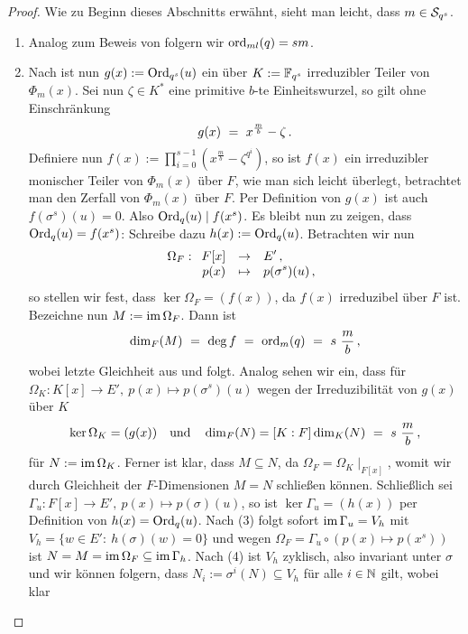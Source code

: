 \begin{proof}
  Wie zu Beginn dieses Abschnitts erwähnt, sieht man leicht, dass
  $m \in \S_{q^s}$.
  \begin{enumerate}
    \item Analog zum Beweis von  
      folgern wir $\ord_{ml}(q) = sm$.
    \item Nach  ist nun
      $g(x) := \Ord_{q^s}(u)$ ein über $K := \F_{q^s}$ irreduzibler Teiler von
      $\Phi_m(x)$. Sei nun $\zeta\in K^\ast$ eine primitive $b$-te Einheitswurzel,
      so gilt ohne Einschränkung
      \[ g(x) \speq= x^{\frac m b} -\zeta\,.\]
      Definiere nun $f(x) := \prod_{i=0}^{s-1} (x^{\frac m b} - \zeta^{q^i})$, 
      so ist $f(x)$ ein irreduzibler monischer Teiler von $\Phi_m(x)$ über $F$,
      wie man sich leicht überlegt, betrachtet man den Zerfall von
      $\Phi_m(x)$ über $F$. Per Definition von $g(x)$ ist auch
      $f(\sigma^s)(u) = 0$. Also $\Ord_q(u) \mid f(x^s)$.
      Es bleibt nun zu zeigen, dass $\Ord_q(u) = f(x^s)$:
      Schreibe dazu $h(x) := \Ord_q(u)$. 
      Betrachten wir nun 
      \[ \Omega_F:\funcdef{ F[x] &\to& E'\,, \\
        p(x) &\mapsto& p(\sigma^s)(u)\,,}\]
      so stellen wir fest, dass $\ker\Omega_F = (f(x))$, da $f(x)$ irreduzibel
      über $F$ ist.
      Bezeichne nun $M := \im\Omega_F$. Dann ist 
      \[ \dim_F(M) \speq= \deg f \speq= \ord_m(q) \speq= s\ \frac m b\,,\]
      wobei letzte Gleichheit aus  und 
      folgt. Analog sehen wir ein, dass für
      $\Omega_K: K[x] \to E',\ p(x) \mapsto p(\sigma^s)(u)$ wegen der
      Irreduzibilität von $g(x)$ über $K$
      \[ \ker\Omega_K = (g(x)) \quad\text{und}\quad
        \dim_F(N)= [K:F]\dim_K(N) \speq= s\ \frac m b\,,\]
      für $N := \im\Omega_K$. Ferner ist klar, dass $M\subseteq N$, da
      $\Omega_F = \Omega_K\mid_{F[x]}$, womit wir durch Gleichheit der
      $F$-Dimensionen $M=N$ schließen können.
      Schließlich sei $\Gamma_u: F[x]\to E',\ p(x) \mapsto p(\sigma)(u)$, so
      ist $\ker\Gamma_u = (h(x))$ per Definition von $h(x)= \Ord_q(u)$. 
      Nach  (3) folgt sofort
      $\im\Gamma_u = V_h$ mit $V_h = \{ w\in E':\ h(\sigma)(w) = 0 \}$
      und wegen $\Omega_F = \Gamma_u \circ (p(x)\mapsto p(x^s))$ ist
      $N = M = \im\Omega_F \subseteq \im \Gamma_h$. Nach 
       (4) ist $V_h$ zyklisch, also invariant
      unter $\sigma$ und wir können folgern, dass
      $N_i := \sigma^i(N) \subseteq V_h$ für alle $i\in \N$ gilt, wobei klar

\end{enumerate}
\end{proof}
